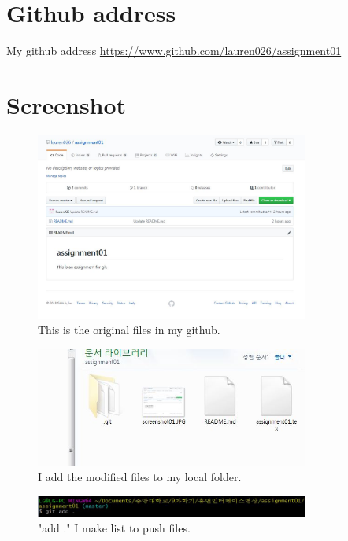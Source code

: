 \documentclass[a4paper]{article}
\begin{document}
\section{Github address}
My github address
\url{https://www.github.com/lauren026/assignment01}

\section{Screenshot}

\begin{figure}
\begin{center}
	\includegraphics[width=0.8\textwidth]{screenshot01.JPG}
	\caption{\label{fig:screenshot01} This is the original files in my github.}
\end{center}
\end{figure}

\begin{figure}
\begin{center}
	\includegraphics[width=0.8\textwidth]{screenshot02.JPG}
	\caption{\label{fig:screenshot02} I add the modified files to my local folder.}
\end{center}
\end{figure}

\begin{figure}
\begin{center}
	\includegraphics[width=0.8\textwidth]{screenshot03.JPG}
	\caption{\label{fig:screenshot03} "add ." I make list to push files.}
\end{center}
\end{figure}
\end{document}
